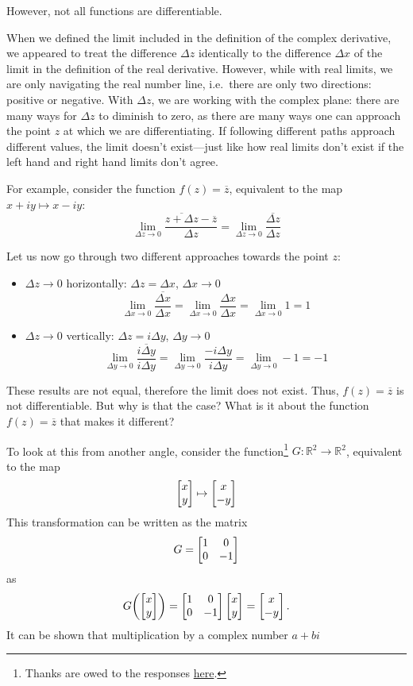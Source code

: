 \documentclass[10pt]{scrartcl}
\numberwithin{equation}{subsection}
\theoremstyle{definition}
\theoremstyle{remark}
\newcommand{\Reals}{\mathbb{R}}
\newcommand*{\conjugate}[1]{\overline{#1}}
\begin{document}
However, not all functions are differentiable. 

When we defined the limit included in the definition of the complex derivative, we appeared to treat
the difference $\Delta z$  identically to the difference $\Delta x$ of the limit in the definition of the real derivative.
However, while with real limits, we are only navigating the real number line, i.e.\ there are only two directions: positive or negative. With $\Delta z$, we are working with the complex plane: there are many ways for $\Delta z$ to diminish to zero, as there are many ways one can approach the point $z$ at which we are differentiating. If following different paths approach different values, the limit doesn't exist---just like how real limits don't exist if the left hand and right hand limits don't agree. 

For example, consider the
function $f(z) = \conjugate{z}$, equivalent to the map $x+iy \mapsto x-iy$:
\[
	\lim_{\Delta z \to 0} \frac{\conjugate{z + \Delta z} -
	\conjugate{z}}{\Delta z} = \lim_{\Delta z \to 0}
	\frac{\conjugate{\Delta z}}{\Delta z}
\]

Let us now go through two different approaches towards the point $z$:
\begin{itemize}
	\item $\Delta z \to 0$ horizontally: $\Delta z = \Delta x$, $\Delta x \to 0$
	\[
		\lim_{\Delta x \to 0} \frac{\conjugate{\Delta x}}{\Delta x} = 
		\lim_{\Delta x \to 0} \frac{\Delta x}{\Delta x} = \lim_{\Delta x \to 0} 1 = 1
	\] 
	\item $\Delta z \to 0$ vertically: $\Delta z = i\Delta y$, $\Delta y \to 0$
	\[
		\lim_{\Delta y \to 0} \frac{\conjugate{i \Delta y}}{i \Delta y} = 
		\lim_{\Delta y \to 0} \frac{- i\Delta y}{i\Delta y} = \lim_{\Delta y \to 0}-1 = -1
	\]
\end{itemize}
These results are not equal, therefore the limit does not exist. Thus, $f(z)=\conjugate{z}$ is not differentiable.
But why is that the case? What is it about the function
$f(z)=\conjugate{z}$ that makes it different?

To look at this from another angle, consider the function\footnote{Thanks are owed to the responses \href{http://math.stackexchange.com/questions/180849/why-is-the-complex-number-z-abi-equivalent-to-the-matrix-form-left-begins}{here}.} $G : \Reals^2 \to \Reals^2$, equivalent to the map
\[
\bmqty{x \\ y} \mapsto \bmqty{x \\  -y}
\] 
This transformation can be written as the matrix
\[
G = \bmqty{1 & 0 \\ 0 & -1}
\]
as
\[
G\pqty{\bmqty{x \\ y} }= \bmqty{1 & 0 \\ 0 & -1} \bmqty{x \\ y}  = \bmqty{x \\ -y} .
\]
It can be shown that multiplication by a complex number $a + bi$ 
\end{document}
